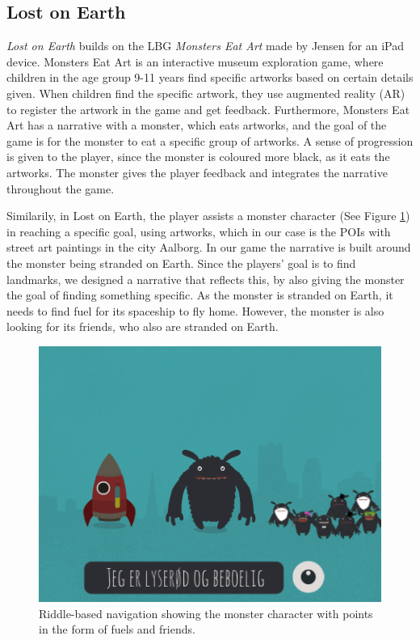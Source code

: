 \subsection{Lost on Earth}
\textit{Lost on Earth} builds on the LBG \textit{Monsters Eat Art} \cite{Lynge} made by Jensen for an iPad device. Monsters Eat Art is an interactive museum exploration game, where children in the age group 9-11 years find specific artworks based on certain details given. When children find the specific artwork, they use augmented reality (AR) to register the artwork in the game and get feedback. Furthermore, Monsters Eat Art has a narrative with a monster, which eats artworks, and the goal of the game is for the monster to eat a specific group of artworks. A sense of progression is given to the player, since the monster is coloured more black, as it eats the artworks. The monster gives the player feedback and integrates the narrative throughout the game.

Similarily, in Lost on Earth, the player assists a monster character (See Figure \ref{monster}) in reaching a specific goal, using artworks, which in our case is the POIs with street art paintings in the city Aalborg. In our game the narrative is built around the monster being stranded on Earth. Since the players' goal is to find landmarks, we designed a narrative that reflects this, by also giving the monster the goal of finding something specific. As the monster is stranded on Earth, it needs to find fuel for its spaceship to fly home. However, the monster is also looking for its friends, who also are stranded on Earth.

\begin{figure}[hbtp]
\centering
\includegraphics[scale=0.24]{Pics/riddles4.png}
\caption{Riddle-based navigation showing the monster character with points in the form of fuels and friends.}
\label{monster}
\end{figure}

